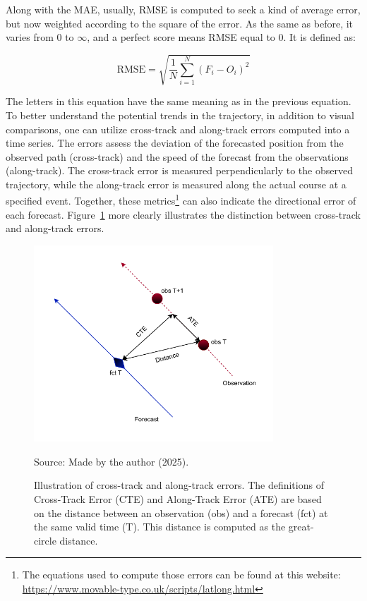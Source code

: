 Along with the MAE, usually, RMSE is computed to seek a kind of average error, but now weighted according to the square of the error. As the same as before, it varies from 0 to $\infty$, and a perfect score means RMSE equal to 0. It is defined as:

\begin{equation}
    \text{RMSE} = \sqrt{\frac{1}{N}\sum_{i=1}^{N} (F_i -O_i)^2}
\end{equation}

The letters in this equation have the same meaning as in the previous equation. To better understand the potential trends in the trajectory, in addition to visual comparisons, one can utilize cross-track and along-track errors computed into a time series. The errors assess the deviation of the forecasted position from the observed path (cross-track) and the speed of the forecast from the observations (along-track). The cross-track error is measured perpendicularly to the observed trajectory, while the along-track error is measured along the actual course at a specified event. Together, these metrics\footnote{The equations used to compute those errors can be found at this website: \url{https://www.movable-type.co.uk/scripts/latlong.html}} can also indicate the directional error of each forecast. Figure~\ref{fig:cross-along-errors} more clearly illustrates the distinction between cross-track and along-track errors. 

\begin{figure}[htbp]
    \centering
    \caption{Illustration of cross-track and along-track errors. The definitions of Cross-Track Error (CTE) and Along-Track Error (ATE) are based on the distance between an observation (obs) and a forecast (fct) at the same valid time (T). This distance is computed as the great-circle distance.} %
    \includegraphics[width=0.8\textwidth]{docs/figuras/chapter4/cte_ate.pdf} 
    \label{fig:cross-along-errors}
    \vspace{0.5em}
    
    \centering
    Source: Made by the author (2025).
\end{figure}

